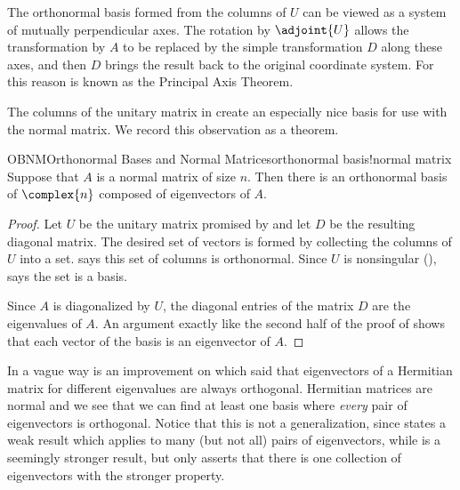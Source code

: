 %
The orthonormal basis formed from the columns of $U$ can be viewed as a system of mutually perpendicular axes.  The rotation by $\adjoint{U}$ allows the transformation by $A$ to be replaced by the simple transformation $D$ along these axes, and then $D$ brings the result back to the original coordinate system.  For this reason  is known as the Principal Axis Theorem.  \par
%
The columns of the unitary matrix in  create an especially nice basis for use with the normal matrix.  We record this observation as a theorem.
%
\begin{theorem}{OBNM}{Orthonormal Bases and Normal Matrices}{orthonormal basis!normal matrix}
Suppose that $A$ is a normal matrix of size $n$.  Then there is an orthonormal basis of $\complex{n}$ composed of eigenvectors of $A$.
\end{theorem}
%
\begin{proof}
Let $U$ be the unitary matrix promised by  and let $D$ be the resulting diagonal matrix.  The desired set of vectors is formed by collecting the columns of $U$ into a set.   says this set of columns is orthonormal.  Since $U$ is nonsingular (),  says the set is a basis.\par
%
Since $A$ is diagonalized by $U$, the diagonal entries of the matrix $D$ are the eigenvalues of $A$.  An argument exactly like the second half of the proof of  shows that each vector of the basis is an eigenvector of $A$.
%
\end{proof}
%
In a vague way  is an improvement on  which said that eigenvectors of a Hermitian matrix for different eigenvalues are always orthogonal.  Hermitian matrices are normal and we see that we can find at least one basis where {\em every} pair of eigenvectors is orthogonal.  Notice that this is not a generalization, since  states a weak result which applies to many (but not all) pairs of eigenvectors, while  is a seemingly stronger result, but only asserts that there is one collection of eigenvectors with the stronger property.
%



